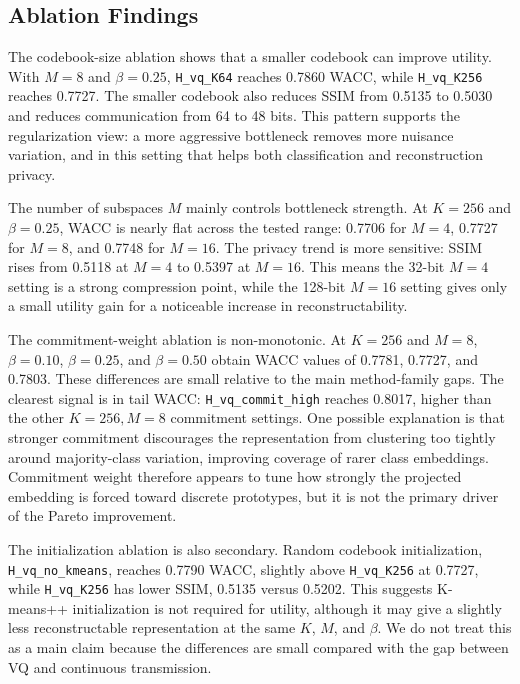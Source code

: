 \documentclass{article}
\begin{document}
\subsection{Ablation Findings}

The codebook-size ablation shows that a smaller codebook can improve utility. With $M=8$ and $\beta=0.25$, \texttt{H\_vq\_K64} reaches 0.7860 WACC, while \texttt{H\_vq\_K256} reaches 0.7727. The smaller codebook also reduces SSIM from 0.5135 to 0.5030 and reduces communication from 64 to 48 bits. This pattern supports the regularization view: a more aggressive bottleneck removes more nuisance variation, and in this setting that helps both classification and reconstruction privacy.

The number of subspaces $M$ mainly controls bottleneck strength. At $K=256$ and $\beta=0.25$, WACC is nearly flat across the tested range: 0.7706 for $M=4$, 0.7727 for $M=8$, and 0.7748 for $M=16$. The privacy trend is more sensitive: SSIM rises from 0.5118 at $M=4$ to 0.5397 at $M=16$. This means the 32-bit $M=4$ setting is a strong compression point, while the 128-bit $M=16$ setting gives only a small utility gain for a noticeable increase in reconstructability.

The commitment-weight ablation is non-monotonic. At $K=256$ and $M=8$, $\beta=0.10$, $\beta=0.25$, and $\beta=0.50$ obtain WACC values of 0.7781, 0.7727, and 0.7803. These differences are small relative to the main method-family gaps. The clearest signal is in tail WACC: \texttt{H\_vq\_commit\_high} reaches 0.8017, higher than the other $K=256,M=8$ commitment settings. One possible explanation is that stronger commitment discourages the representation from clustering too tightly around majority-class variation, improving coverage of rarer class embeddings. Commitment weight therefore appears to tune how strongly the projected embedding is forced toward discrete prototypes, but it is not the primary driver of the Pareto improvement.

The initialization ablation is also secondary. Random codebook initialization, \texttt{H\_vq\_no\_kmeans}, reaches 0.7790 WACC, slightly above \texttt{H\_vq\_K256} at 0.7727, while \texttt{H\_vq\_K256} has lower SSIM, 0.5135 versus 0.5202. This suggests K-means++ initialization is not required for utility, although it may give a slightly less reconstructable representation at the same $K$, $M$, and $\beta$. We do not treat this as a main claim because the differences are small compared with the gap between VQ and continuous transmission.
\end{document}
